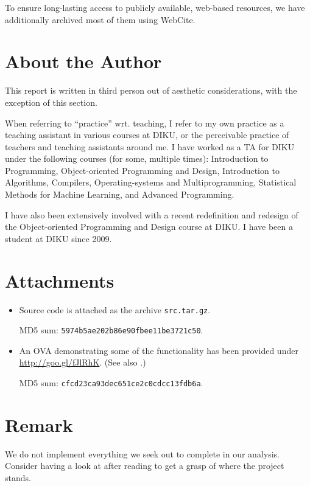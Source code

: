 To ensure long-lasting access to publicly available, web-based resources, we
have additionally archived most of them using
WebCite\textsuperscript{\textregistered}.

\section{About the Author}

This report is written in third person out of aesthetic considerations, with
the exception of this section.

When referring to ``practice'' wrt. teaching, I refer to my own practice as a
teaching assistant in various courses at DIKU, or the perceivable practice of
teachers and teaching assistants around me. I have worked as a TA for DIKU
under the following courses (for some, multiple times): Introduction to
Programming, Object-oriented Programming and Design, Introduction to
Algorithms, Compilers, Operating-systems and Multiprogramming, Statistical
Methods for Machine Learning, and Advanced Programming.

I have also been extensively involved with a recent redefinition and redesign
of the Object-oriented Programming and Design course at DIKU. I have been a
student at DIKU since 2009.

\section{Attachments}

\begin{itemize}

\item Source code is attached as the archive \texttt{src.tar.gz}.

\noindent MD5 sum: \texttt{5974b5ae202b86e90fbee11be3721c50}.

\item An OVA demonstrating some of the functionality has been provided under
\url{http://goo.gl/fJlRhK}. (See also .)

\noindent MD5 sum: \texttt{cfcd23ca93dec651ce2c0cdcc13fdb6a}.

\end{itemize}

\section{Remark}

We do not implement everything we seek out to complete in our analysis.
Consider having a look at  after reading
 to get a grasp of where the project stands.
